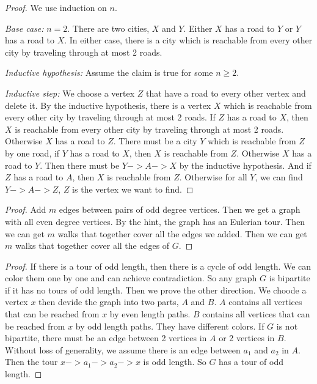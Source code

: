 \documentclass[11pt]{article}
\begin{document}
\begin{solution}
    \begin{Parts}
        \Part
        \begin{proof}
            We use induction on $n$.
            
            \emph{Base case:} $n = 2$. There are two cities, $X$ and $Y$. Either $X$ has a road to $Y$ or $Y$ has a road to $X$. In either case, there is a city which is reachable from every other city by traveling through at most 2 roads.
            
            \emph{Inductive hypothesis:} Assume the claim is true for some $n \ge 2$.
            
            \emph{Inductive step:} 
            We choose a vertex $Z$ that have a road to every other vertex and delete it. By the inductive hypothesis, there is a vertex $X$ which is reachable from every other city by traveling through at most 2 roads. If $Z$ has a road to $X$, then $X$ is reachable from every other city by traveling through at most 2 roads. Otherwise $X$ has a road to $Z$. There must be a city $Y$ which is reachable from $Z$ by one road, if $Y$ has a road to $X$, then $X$ is reachable from $Z$. Otherwise $X$ has a road to $Y$. Then there must be $Y->A->X$ by the inductive hypothesis. And if $Z$ has a road to $A$, then $X$ is reachable from $Z$. Otherwise for all $Y$, we can find $Y->A->Z$, $Z$ is the vertex we want to find.
        \end{proof}
        
        \Part
        \begin{proof}
            Add $m$ edges between pairs of odd degree vertices. Then we get a graph with all even degree vertices. 
            By the hint, the graph has an Eulerian tour. Then we can get $m$ walks that together cover all the edges we added. 
            Then we can get $m$ walks that together cover all the edges of $G$.
        \end{proof}

        \Part
        \begin{proof}
            If there is a tour of odd length, then there is a cycle of odd length. We can color them one by one and can achieve contradiction. So any graph $G$ is bipartite if it has no tours of odd length.
            Then we prove the other direction. 
            We choode a vertex $x$ then devide the graph into two parts, $A$ and $B$. $A$ contains all vertices that can be reached from $x$ by even length paths. $B$ contains all vertices that can be reached from $x$ by odd length paths. 
            They have different colors. 
            If $G$ is not bipartite, there must be an edge between 2 vertices in $A$ or 2 vertices in $B$.
            Without loss of generality, we assume there is an edge between $a_1$ and $a_2$ in $A$.
            Then the tour $x->a_1->a_2->x$ is odd length. So $G$ has a tour of odd length.
        \end{proof}
    \end{Parts}
\end{solution}
\end{document}
